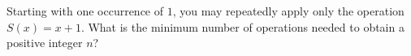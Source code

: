 Starting with one occurrence of $ 1 $, you may repeatedly apply only the operation $ S(x)=x+1 $. What is the minimum number of operations needed to obtain a positive integer $ n $?
